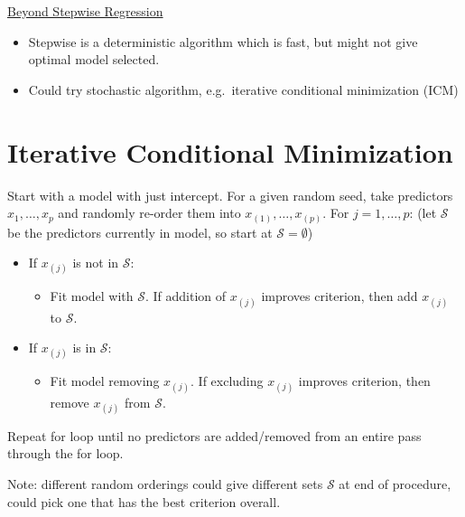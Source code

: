 \underline{Beyond Stepwise Regression}
\begin{itemize}
      \item Stepwise is a deterministic algorithm which is fast,
            but might not give optimal model selected.
      \item Could try stochastic algorithm, e.g.\ iterative
            conditional minimization (ICM)
\end{itemize}

\section{Iterative Conditional Minimization}
Start with a model with just intercept.
For a given random seed, take predictors $ x_1,\ldots,x_p $
and randomly re-order them into $ x_{(1)},\ldots,x_{(p)} $.
For $ j=1,\ldots,p $: (let $ \mathcal{S} $ be the predictors
currently in model, so start at $ \mathcal{S}=\emptyset $)
\begin{itemize}
      \item If $ x_{(j)} $ is not in $ \mathcal{S} $:
            \begin{itemize}
                  \item Fit model with $ \mathcal{S} $.
                        If addition of $ x_{(j)} $ improves criterion,
                        then add $ x_{(j)} $ to $ \mathcal{S} $.
            \end{itemize}
      \item If $ x_{(j)} $ is in $ \mathcal{S} $:
            \begin{itemize}
                  \item Fit model removing $ x_{(j)} $. If excluding
                        $ x_{(j)} $ improves criterion, then remove
                        $ x_{(j)} $ from $ \mathcal{S} $.
            \end{itemize}
\end{itemize}
Repeat for loop until no predictors are added/removed
from an entire pass through the for loop.

Note: different random orderings could give different
sets $ \mathcal{S} $ at end of procedure, could pick one
that has the best criterion overall.
